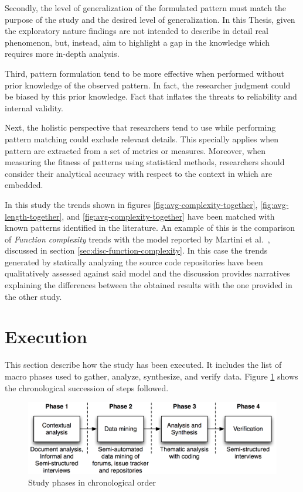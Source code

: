 Secondly, the level of generalization of the formulated pattern must match the purpose of the study and the desired level of generalization. In this Thesis, given the exploratory nature findings are not intended to describe in detail real phenomenon, but, instead, aim to highlight a gap in the knowledge which requires more in-depth analysis.

Third, pattern formulation tend to be more effective when performed without prior knowledge of the observed pattern. In fact, the researcher judgment could be biased by this prior knowledge. Fact that inflates the threats to reliability and internal validity.

Next, the holistic perspective that researchers tend to use while performing pattern matching could exclude relevant details. This specially applies when pattern are extracted from a set of metrics or measures. Moreover, when measuring the fitness of patterns using statistical methods, researchers should consider their analytical accuracy with respect to the context in which are embedded.

In this study the trends shown in figures \ref{fig:avg-complexity-together}, \ref{fig:avg-length-together}, and \ref{fig:avg-complexity-together} have been matched with known patterns identified in the literature. An example of this is the comparison of \textit{Function complexity} trends with the model reported by Martini et al.\ \cite{martini2014architecture}, discussed in section \ref{sec:disc-function-complexity}. In this case the trends generated by statically analyzing the source code repositories have been qualitatively assessed against said model and the discussion provides narratives explaining the differences between the obtained results with the one provided in the other study.


\section{Execution}
This section describe how the study has been executed. It includes the list of macro phases used to gather, analyze, synthesize, and verify data.
Figure \ref{fig:study-phases} shows the chronological succession of steps followed.

\begin{figure}[hbt]
    \centering
    \includegraphics[width=\textwidth]{figure/methods/steps.png}
    \caption{Study phases in chronological order}
    \label{fig:study-phases}
\end{figure}

